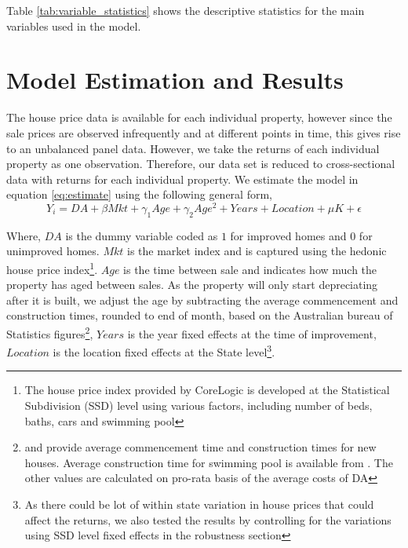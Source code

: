 \documentclass{article}
\begin{document}
Table \ref{tab:variable_statistics} shows the descriptive statistics for the main variables used in the model.

\section{Model Estimation and Results}

The house price data is available for each individual property, however since the sale prices are observed infrequently and at different points in time, this gives rise to an unbalanced panel data. However, we take the returns of each individual property as one observation. Therefore, our data set is reduced to cross-sectional data with returns for each individual property. We estimate the model in equation \ref{eq:estimate} using the following general form,
\begin{equation}
    Y_i = DA + \beta{Mkt} + \gamma_1{Age} + \gamma_2{Age^2} + Years + Location + \mu{K} + \epsilon
\end{equation}

Where, $DA$ is the dummy variable coded as $1$ for improved homes and $0$ for unimproved homes. $Mkt$ is the market index and is captured using the hedonic house price index\footnote{The house price index provided by CoreLogic is developed at the Statistical Subdivision (SSD) level using various factors, including number of beds, baths, cars and swimming pool}. $Age$ is the time between sale and indicates how much the property has aged between sales. As the property will only start depreciating after it is built, we adjust the age by subtracting the average commencement and construction times, rounded to end of month, based on the Australian bureau of Statistics figures\footnote{\citet{abs_house_times_commence} and \citet{abs_house_times} provide average commencement time and construction times for new houses. Average construction time for swimming pool is available from \citep{hi_swimming_time}. The other values are calculated on pro-rata basis of the average costs of DA}, $Years$ is the year fixed effects at the time of improvement, $Location$ is the location fixed effects at the State level\footnote{As there could be lot of within state variation in house prices that could affect the returns, we also tested the results by controlling for the variations using SSD level fixed effects in the robustness section}. 
\end{document}
